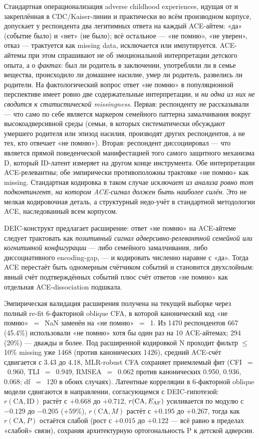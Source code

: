 Стандартная операционализация adverse childhood experiences, идущая от \citet{felitti1998} и закреплённая в CDC/Kaiser-линии и практически во всём производном корпусе, допускает у респондента два легитимных ответа на каждый ACE-айтем: «да» (событие было) и «нет» (не было); всё остальное --- «не помню», «не уверен», отказ --- трактуется как missing data, исключается или импутируется. ACE-айтемы при этом спрашивают не об эмоциональной интерпретации детского опыта, а о \emph{фактах}: был ли родитель в заключении, употребляли ли в семье вещества, происходило ли домашнее насилие, умер ли родитель, развелись ли родители. На фактологический вопрос ответ «не помню» в популяционной перспективе имеет ровно две содержательные интерпретации, и \emph{ни одна из них не сводится к статистической missingness}. Первая: респонденту не рассказывали --- что само по себе является маркером семейного паттерна замалчивания вокруг высокоадверсивной среды (семьи, в которых систематически обсуждают умершего родителя или эпизод насилия, производят других респондентов, а не тех, кто отвечает «не помню»). Вторая: респондент диссоциировал --- что является прямой поведенческой манифестацией того самого защитного механизма D, который ID-латент измеряет на другом конце инструмента. Обе интерпретации ACE-релевантны; обе эмпирически противоположны трактовке «не помню» как missing. Стандартная кодировка в таком случае \emph{исключает из анализа ровно тот подконтингент, на котором ACE-сигнал должен быть наиболее силён}. Это не мелкая кодировочная деталь, а структурный недо-учёт в стандартной методологии ACE, наследованный всем корпусом.

DEIC-конструкт предлагает расширение: ответ «не помню» на ACE-айтеме следует трактовать как \emph{позитивный сигнал адверсивно-релевантной семейной или когнитивной конфигурации} --- либо семейного замалчивания, либо диссоциативного encoding-gap, --- и кодировать численно наравне с «да». Тогда ACE перестаёт быть одномерным счётчиком событий и становится двухслойным: явный счёт подтверждённых событий плюс счёт ответов «не помню» как отдельная ACE-dissociation подшкала.

Эмпирическая валидация расширения получена на текущей выборке через полный re-fit 6-факторной oblique CFA, в которой канонический код «не помню»~$=$~NaN заменён на «не помню»~$=$~1. Из 1470 респондентов 667 (45.4\%) использовали «не помню» хотя бы один раз на 10 ACE-айтемах; 294 (20\%) --- дважды и более. Под расширенной кодировкой N проходит фильтр $\le$10\% missing уже 1468 (против канонических 1426), средний ACE-счёт сдвигается с 3.43 до 4.18, MLR-robust CFA сохраняет приемлемый фит (CFI~$=$~0.960, TLI~$=$~0.949, RMSEA~$=$~0.062 против канонических 0.950, 0.936, 0.068; df~$=$~120 в обоих случаях). Латентные корреляции в 6-факторной oblique модели сдвигаются в направлении, согласующемся с DEIC-гипотезой: $r(\text{CA}, \text{ID})$ растёт с $+0.668$ до $+0.712$, $r(\text{CA}, E_{\mathrm{AF}}{})$ усиливается по модулю с $-0.129$ до $-0.205$ ($+59\%$), $r(\text{CA}, M)$ растёт с $+0.195$ до $+0.267$, тогда как $r(\text{CA}, P)$ остаётся слабой (рост с $+0.015$ до $+0.122$ --- всё равно в пределах «слабой» связи), сохраняя архитектурную орто\-гональность P к детской адверсии.

